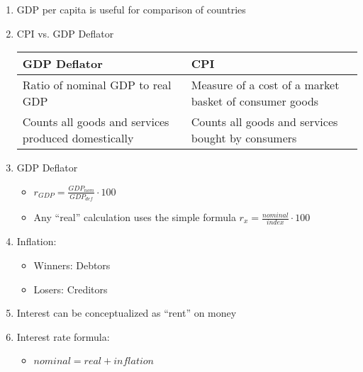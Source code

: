 \documentclass[12pt]{article}
\begin{document}
\begin{enumerate}
\begin{enumerate}
\begin{itemize}
        \end{itemize}

      \item GDP per capita is useful for comparison of countries

      \item CPI vs. GDP Deflator

        \begin{center}
          \begin{tabular}{|p{}|p{}|}
            \hline
            GDP Deflator & CPI\\
            \hline
            Ratio of nominal GDP to real GDP & Measure of a cost of a market basket of consumer goods\\
            \hline
            Counts all goods and services produced domestically & Counts all goods and services bought by consumers\\
            \hline
          \end{tabular}
        \end{center}

      \item GDP Deflator

        \begin{itemize}

          \item $r_{GDP} = \frac{GDP_{nom}}{GDP_{def}}\cdot 100$

          \item Any “real” calculation uses the simple formula $r_{x} = \frac{nominal}{index}\cdot 100$

        \end{itemize}

      \item Inflation:

        \begin{itemize}

          \item Winners: Debtors

          \item Losers: Creditors

        \end{itemize}

      \item Interest can be conceptualized as “rent” on money

      \item Interest rate formula:

        \begin{itemize}

          \item $nominal = real + inflation$

        \end{itemize}

    \end{enumerate}

\end{enumerate}
\end{document}
